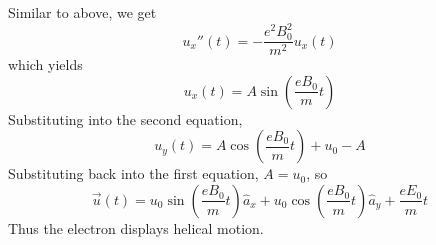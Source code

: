 \documentclass[answers]{exam}
\begin{document}
\begin{questions}
\begin{solution}
    Similar to above, we get
    $$u_x''(t) = -\frac{e^2B_0^2}{m^2} u_x(t)$$
    which yields
    $$u_x(t) = A\sin\left(\frac{eB_0}{m}t\right)$$
    Substituting into the second equation,
    $$u_y(t) = A\cos\left(\frac{eB_0}{m}t\right) + u_0 - A$$
    Substituting back into the first equation, $A = u_0$, so
    $$\vec u(t) = u_0\sin\left(\frac{eB_0}{m}t\right) \hat a_x + u_0\cos\left(\frac{eB_0}{m}t\right) \hat a_y + \frac{eE_0}{m}t$$
    Thus the electron displays helical motion.
\end{solution}



\end{questions}
\end{document}
